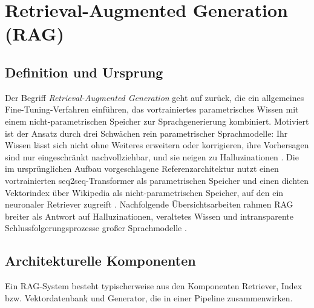 %

\section{Retrieval-Augmented Generation (RAG)}
\label{sec:rag}

\subsection{Definition und Ursprung}
\label{sec:rag-definition}

Der Begriff \textit{Retrieval-Augmented Generation} geht auf \textcite[1]{Lewis.2020} zurück, die ein allgemeines Fine-Tuning-Verfahren einführen, das vortrainiertes parametrisches Wissen mit einem nicht-para\-metrischen Speicher zur Sprachgenerierung kombiniert. Motiviert ist der Ansatz durch drei Schwächen rein parametrischer Sprachmodelle: Ihr Wissen lässt sich nicht ohne Weiteres erweitern oder korrigieren, ihre Vorhersagen sind nur eingeschränkt nachvollziehbar, und sie neigen zu Halluzinationen \autocite[1]{Lewis.2020}. Die im ursprünglichen Aufbau vorgeschlagene Referenzarchitektur nutzt einen vortrainierten seq2\-seq-Transformer als parametrischen Speicher und einen dichten Vektorindex über Wikipedia als nicht-parametrischen Speicher, auf den ein neuronaler Retriever zugreift \autocite[2]{Lewis.2020}. Nachfolgende Übersichtsarbeiten rahmen RAG breiter als Antwort auf Halluzinationen, veraltetes Wissen und intransparente Schlussfolgerungsprozesse großer Sprachmodelle \autocite[1]{Gao.2024}.

\subsection{Architekturelle Komponenten}
\label{sec:rag-komponenten}

Ein RAG-System besteht typischerweise aus den Komponenten Retriever, Index bzw. Vektordatenbank und Generator, die in einer Pipeline zusammenwirken.

